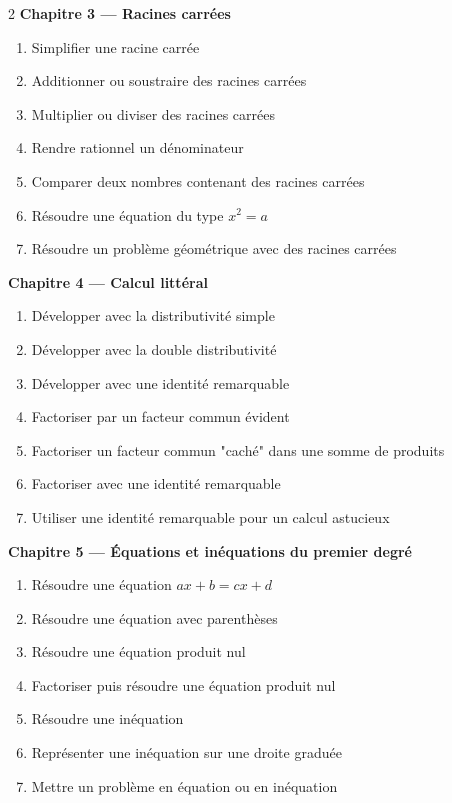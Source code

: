 \begin{multicols}{2}
\textbf{\normalsize\color{onbo}Chapitre 3 --- Racines carrées}
\begin{enumerate}[label=\arabic*.,itemsep=1pt,topsep=2pt,leftmargin=1.6em]
\item Simplifier une racine carrée
\item Additionner ou soustraire des racines carrées
\item Multiplier ou diviser des racines carrées
\item Rendre rationnel un dénominateur
\item Comparer deux nombres contenant des racines carrées
\item Résoudre une équation du type $x^{2}=a$
\item Résoudre un problème géométrique avec des racines carrées
\end{enumerate}
\vspace{4pt}

\textbf{\normalsize\color{onbo}Chapitre 4 --- Calcul littéral}
\begin{enumerate}[label=\arabic*.,itemsep=1pt,topsep=2pt,leftmargin=1.6em]
\item Développer avec la distributivité simple
\item Développer avec la double distributivité
\item Développer avec une identité remarquable
\item Factoriser par un facteur commun évident
\item Factoriser un facteur commun "caché" dans une somme de produits
\item Factoriser avec une identité remarquable
\item Utiliser une identité remarquable pour un calcul astucieux
\end{enumerate}
\vspace{4pt}

\textbf{\normalsize\color{onbo}Chapitre 5 --- Équations et inéquations du premier degré}
\begin{enumerate}[label=\arabic*.,itemsep=1pt,topsep=2pt,leftmargin=1.6em]
\item Résoudre une équation $ax+b=cx+d$
\item Résoudre une équation avec parenthèses
\item Résoudre une équation produit nul
\item Factoriser puis résoudre une équation produit nul
\item Résoudre une inéquation
\item Représenter une inéquation sur une droite graduée
\item Mettre un problème en équation ou en inéquation
\end{enumerate}
\vspace{4pt}


\end{multicols}
